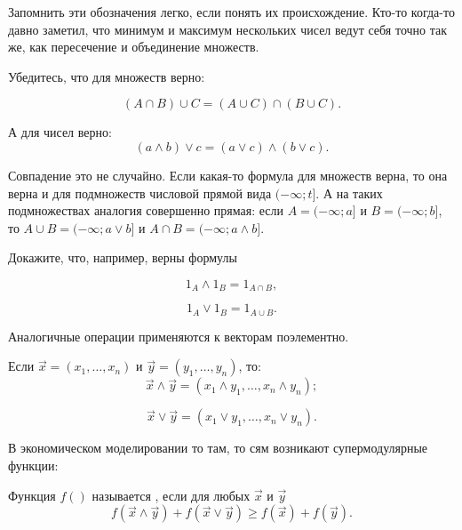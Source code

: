 Запомнить эти обозначения легко, если понять их происхождение. Кто-то когда-то давно заметил, что минимум и максимум нескольких чисел ведут себя точно так же, как пересечение и объединение множеств.

Убедитесь, что для множеств верно:

\begin{equation}
(A \cap B)\cup C=(A\cup C)\cap (B\cup C).
\end{equation}

А для чисел верно:
\begin{equation}
(a \wedge b)\vee c=(a\vee c)\wedge (b\vee c).
\end{equation}

Совпадение это не случайно. Если какая-то формула для множеств верна, то она верна и для подмножеств числовой прямой вида $ (-\infty;t] $. А на таких подмножествах аналогия совершенно прямая: если $ A=(-\infty;a] $ и $ B=(-\infty;b] $, то $ A\cup B= (-\infty;a\vee b] $ и $ A\cap B=(-\infty;a\wedge b] $.

Докажите, что, например, верны формулы

\begin{equation}
1_{A}\wedge 1_{B}=1_{A\cap B},
\end{equation}

\begin{equation}
1_{A}\vee 1_{B}=1_{A\cup B}.
\end{equation}



Аналогичные операции применяются к векторам поэлементно.

\begin{mydef} Если $ \vec{x}=(x_{1},\ldots, x_{n}) $ и $ \vec{y}=(y_{1},\ldots, y_{n}) $, то:
\begin{equation}
\vec{x}\wedge\vec{y}=(x_{1}\wedge y_{1}, \ldots, x_{n}\wedge y_{n});
\end{equation}

\begin{equation}
\vec{x}\vee\vec{y}=(x_{1}\vee y_{1}, \ldots, x_{n}\vee y_{n}).
\end{equation}

\end{mydef}


В экономическом моделировании то там, то сям возникают супермодулярные функции:

\begin{mydef} Функция $ f() $ называется , если для любых $ \vec{x} $ и $ \vec{y} $
\begin{equation}
f(\vec{x}\wedge\vec{y})+f(\vec{x}\vee\vec{y})\geq f(\vec{x})+f(\vec{y}).
\end{equation}

\end{mydef}

